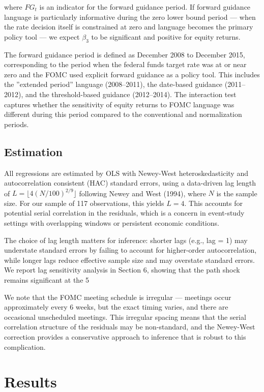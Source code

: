 \documentclass[12pt]{article}
\begin{document}
where $FG_t$ is an indicator for the forward guidance period. If forward guidance language is particularly informative during the zero lower bound period --- when the rate decision itself is constrained at zero and language becomes the primary policy tool --- we expect $\beta_3$ to be significant and positive for equity returns.

The forward guidance period is defined as December 2008 to December 2015, corresponding to the period when the federal funds target rate was at or near zero and the FOMC used explicit forward guidance as a policy tool. This includes the ''extended period'' language (2008–2011), the date-based guidance (2011–2012), and the threshold-based guidance (2012–2014). The interaction test captures whether the sensitivity of equity returns to FOMC language was different during this period compared to the conventional and normalization periods.

\subsection{Estimation}

All regressions are estimated by OLS with Newey-West heteroskedasticity and autocorrelation consistent (HAC) standard errors, using a data-driven lag length of $L = \lfloor 4(N/100)^{2/9} \rfloor$ following Newey and West (1994), where $N$ is the sample size. For our sample of 117 observations, this yields $L = 4$. This accounts for potential serial correlation in the residuals, which is a concern in event-study settings with overlapping windows or persistent economic conditions.

The choice of lag length matters for inference: shorter lags (e.g., lag = 1) may understate standard errors by failing to account for higher-order autocorrelation, while longer lags reduce effective sample size and may overstate standard errors. We report lag sensitivity analysis in Section 6, showing that the path shock remains significant at the 5%

We note that the FOMC meeting schedule is irregular --- meetings occur approximately every 6 weeks, but the exact timing varies, and there are occasional unscheduled meetings. This irregular spacing means that the serial correlation structure of the residuals may be non-standard, and the Newey-West correction provides a conservative approach to inference that is robust to this complication.


\section{Results}
\end{document}
